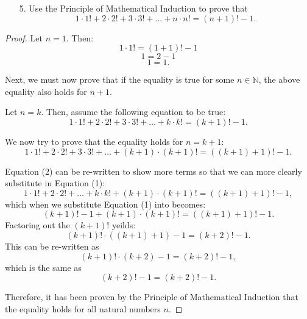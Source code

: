 \documentclass[10pt]{article}
\theoremstyle{definition}
\theoremstyle{plain}
\newcommand{\N}{\mathbb{N}}
\begin{document}
\pagebreak



\begin{enumerate}
  \item[5.] Use the Principle of Mathematical Induction to prove that
  $$1 \cdot 1! + 2 \cdot 2! + 3 \cdot 3! + \dots + n \cdot n! = (n+1)! - 1.$$
\end{enumerate}

\setcounter{equation}{0}
\begin{proof}
  Let $n=1$. Then:
  $$1\cdot 1! = (1+1)! - 1$$
  $$1 = 2 - 1$$
  $$1 = 1.$$

  \par Next, we must now prove that if the equality is true for some $n\in\N$, the above equality also holds for $n+1$.

  \par Let $n=k$. Then, assume the following equation to be true:
  \begin{equation}
    1 \cdot 1! + 2 \cdot 2! + 3 \cdot 3! + \dots + k \cdot k! = (k+1)! - 1.
  \end{equation}

  \par We now try to prove that the equality holds for $n=k+1$:
  \begin{equation}
    1 \cdot 1! + 2 \cdot 2! + 3 \cdot 3! + \dots + (k+1)\cdot (k+1)! = ((k+1)+1)! - 1.
  \end{equation}

  \par Equation (2) can be re-written to show more terms so that we can more clearly substitute in Equation (1):
  $$1 \cdot 1! + 2 \cdot 2! + \dots + k \cdot k! + (k+1)\cdot (k+1)! = ((k+1)+1)! - 1,$$
  which when we substitute Equation (1) into becomes:
  $$(k+1)! - 1 + (k+1)\cdot (k+1)! = ((k+1)+1)! - 1.$$
  Factoring out the $(k+1)!$ yeilds:
  $$(k+1)! \cdot ((k+1)+1) - 1 = (k+2)! - 1.$$
  This can be re-written as
  $$(k+1)! \cdot (k+2) - 1 = (k+2)! - 1,$$
  which is the same as
  \begin{equation}
    (k+2)! - 1 = (k+2)! - 1.
  \end{equation}

  \par Therefore, it has been proven by the Principle of Mathematical Induction that the equality holds for all natural numbers $n$.
\end{proof}
\end{document}
